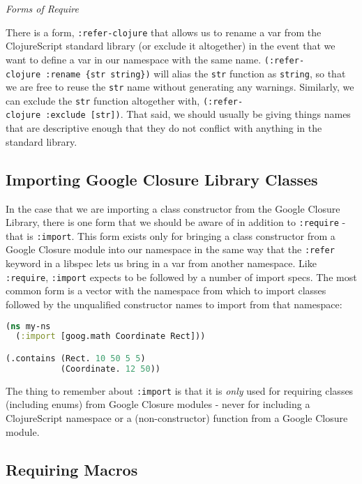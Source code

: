 \documentclass[10pt,twoside,openright]{memoir}
\begin{document}
\emph{Forms of Require}

\begin{notice}[title={\texttt{:refer-clojure}}]
There is a form, \texttt{:refer-clojure} that allows us to rename a var
from the ClojureScript standard library (or exclude it altogether) in
the event that we want to define a var in our namespace with the same
name. \texttt{(:refer-clojure\ :rename\ \{str\ string\})} will alias the
\texttt{str} function as \texttt{string}, so that we are free to reuse
the \texttt{str} name without generating any warnings. Similarly, we can
exclude the \texttt{str} function altogether with,
\texttt{(:refer-clojure\ :exclude\ {[}str{]})}. That said, we should
usually be giving things names that are descriptive enough that they do
not conflict with anything in the standard library.
\end{notice}


\subsection{Importing Google Closure Library Classes}

In the case that we are importing a class constructor from the Google
Closure Library, there is one form that we should be aware of in
addition to \texttt{:require} - that is \texttt{:import}. This form
exists only for bringing a class constructor from a Google Closure
module into our namespace in the same way that the \texttt{:refer}
keyword in a libspec lets us bring in a var from another namespace. Like
\texttt{:require}, \texttt{:import} expects to be followed by a number
of import specs. The most common form is a vector with the namespace
from which to import classes followed by the unqualified constructor
names to import from that namespace:

\begin{lstlisting}[language=Clojure]
(ns my-ns
  (:import [goog.math Coordinate Rect]))

(.contains (Rect. 10 50 5 5)
           (Coordinate. 12 50))
\end{lstlisting}

The thing to remember about \texttt{:import} is that it is \emph{only}
used for requiring classes (including enums) from Google Closure modules
- never for including a ClojureScript namespace or a (non-constructor)
function from a Google Closure module.


\subsection{Requiring Macros}
\end{document}
